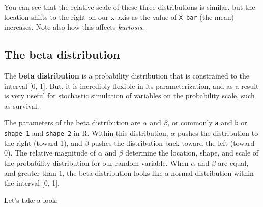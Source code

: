 \documentclass[
]{book}
\begin{document}
You can see that the relative scale of these three distributions is similar, but the location shifts to the right on our x-axis as the value of \texttt{X\_bar} (the mean) increases. Note also how this affects \emph{kurtosis}.

\hypertarget{the-beta-distribution}{%
\subsection{The beta distribution}\label{the-beta-distribution}}

The \textbf{beta distribution} is a probability distribution that is constrained to the interval {[}0, 1{]}. But, it is incredibly flexible in its parameterization, and as a result is very useful for stochastic simulation of variables on the probability scale, such as survival.

The parameters of the beta distribution are \(\alpha\) and \(\beta\), or commonly \texttt{a} and \texttt{b} or \texttt{shape\ 1} and \texttt{shape\ 2} in R. Within this distribution, \(\alpha\) pushes the distribution to the right (toward 1), and \(\beta\) pushes the distribution back toward the left (toward 0). The relative magnitude of \(\alpha\) and \(\beta\) determine the location, shape, and scale of the probability distribution for our random variable. When \(\alpha\) and \(\beta\) are equal, and greater than 1, the beta distribution looks like a normal distribution within the interval {[}0, 1{]}.

Let's take a look:
\end{document}
